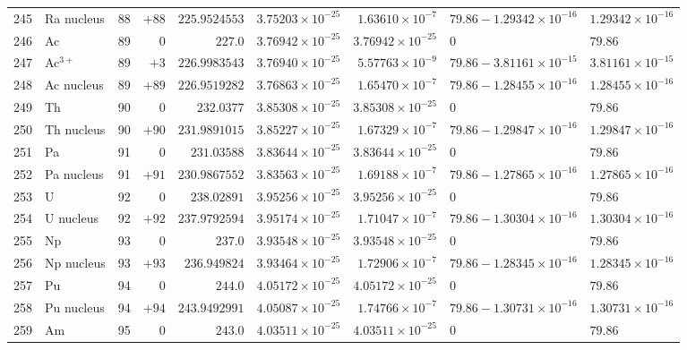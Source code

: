 {\begin{tabular}{@{}r l r r r r r l l@{}}
245 & Ra nucleus & 88 & $+88$ & $225.9524553$ & $3.75203{\times}10^{-25}$ & $1.63610{\times}10^{-7}$ & $79.86 - 1.29342{\times}10^{-16}$ & $1.29342{\times}10^{-16}$ \\
246 & Ac & 89 & $0$ & $227.0$ & $3.76942{\times}10^{-25}$ & $3.76942{\times}10^{-25}$ & $0$ & $79.86$ \\
247 & Ac$^{3+}$ & 89 & $+3$ & $226.9983543$ & $3.76940{\times}10^{-25}$ & $5.57763{\times}10^{-9}$ & $79.86 - 3.81161{\times}10^{-15}$ & $3.81161{\times}10^{-15}$ \\
248 & Ac nucleus & 89 & $+89$ & $226.9519282$ & $3.76863{\times}10^{-25}$ & $1.65470{\times}10^{-7}$ & $79.86 - 1.28455{\times}10^{-16}$ & $1.28455{\times}10^{-16}$ \\
249 & Th & 90 & $0$ & $232.0377$ & $3.85308{\times}10^{-25}$ & $3.85308{\times}10^{-25}$ & $0$ & $79.86$ \\
250 & Th nucleus & 90 & $+90$ & $231.9891015$ & $3.85227{\times}10^{-25}$ & $1.67329{\times}10^{-7}$ & $79.86 - 1.29847{\times}10^{-16}$ & $1.29847{\times}10^{-16}$ \\
251 & Pa & 91 & $0$ & $231.03588$ & $3.83644{\times}10^{-25}$ & $3.83644{\times}10^{-25}$ & $0$ & $79.86$ \\
252 & Pa nucleus & 91 & $+91$ & $230.9867552$ & $3.83563{\times}10^{-25}$ & $1.69188{\times}10^{-7}$ & $79.86 - 1.27865{\times}10^{-16}$ & $1.27865{\times}10^{-16}$ \\
253 & U & 92 & $0$ & $238.02891$ & $3.95256{\times}10^{-25}$ & $3.95256{\times}10^{-25}$ & $0$ & $79.86$ \\
254 & U nucleus & 92 & $+92$ & $237.9792594$ & $3.95174{\times}10^{-25}$ & $1.71047{\times}10^{-7}$ & $79.86 - 1.30304{\times}10^{-16}$ & $1.30304{\times}10^{-16}$ \\
255 & Np & 93 & $0$ & $237.0$ & $3.93548{\times}10^{-25}$ & $3.93548{\times}10^{-25}$ & $0$ & $79.86$ \\
256 & Np nucleus & 93 & $+93$ & $236.949824$ & $3.93464{\times}10^{-25}$ & $1.72906{\times}10^{-7}$ & $79.86 - 1.28345{\times}10^{-16}$ & $1.28345{\times}10^{-16}$ \\
257 & Pu & 94 & $0$ & $244.0$ & $4.05172{\times}10^{-25}$ & $4.05172{\times}10^{-25}$ & $0$ & $79.86$ \\
258 & Pu nucleus & 94 & $+94$ & $243.9492991$ & $4.05087{\times}10^{-25}$ & $1.74766{\times}10^{-7}$ & $79.86 - 1.30731{\times}10^{-16}$ & $1.30731{\times}10^{-16}$ \\
259 & Am & 95 & $0$ & $243.0$ & $4.03511{\times}10^{-25}$ & $4.03511{\times}10^{-25}$ & $0$ & $79.86$ \\

\end{tabular}}
